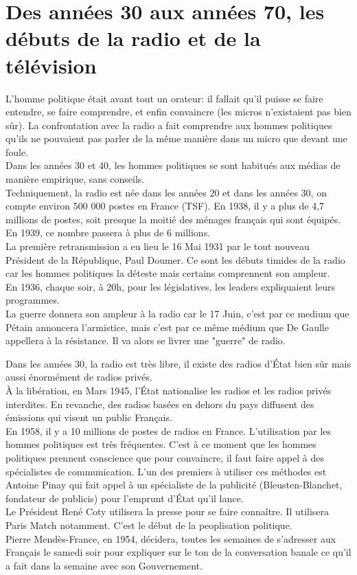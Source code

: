 \documentclass[12pt, a4paper, openany]{book}
\begin{document}
\section{Des années 30 aux années 70, les débuts de la radio et de la télévision}

L'homme politique était avant tout un orateur: il fallait qu'il puisse se faire entendre, se faire comprendre, et enfin convaincre (les micros n'existaient pas bien sûr). La confrontation avec la radio a fait comprendre aux hommes politiques qu'ils ne pouvaient pas parler de la même manière dans un micro que devant une foule. \\
Dans les années 30 et 40, les hommes politiques se sont habitués aux médias de manière empirique, sans conseils. \\
Techniquement, la radio est née dans les années 20 et dans les années 30, on compte environ 500 000 postes en France (TSF). En 1938, il y a plus de 4,7 millions de postes, soit presque la moitié des ménages français qui sont équipés. En 1939, ce nombre passera à plus de 6 millions. \\
La première retransmission a eu lieu le 16 Mai 1931 par le tout nouveau Président de la République, Paul Doumer. Ce sont les débuts timides de la radio car les hommes politiques la déteste mais certains comprennent son ampleur. \\
En 1936, chaque soir, à 20h, pour les législatives, les leaders expliquaient leurs programmes. \\
La guerre donnera son ampleur à la radio car le 17 Juin, c'est par ce medium que Pétain annoncera l'armistice, mais c'est par ce même médium que De Gaulle appellera à la résistance. Il va alors se livrer une "guerre" de radio.


Dans les années 30, la radio est très libre, il existe des radios d'État bien sûr mais aussi énormément de radios privés. \\
À la libération, en Mars 1945, l'État nationalise les radios et les radios privés interdites. En revanche, des radios basées en dehors du pays diffusent des émissions qui visent un public Français. \\
En 1958, il y a 10 millions de postes de radios en France. L'utilisation par les hommes politiques est très fréquentes. C'est à ce moment que les hommes politiques prennent conscience que pour convaincre, il faut faire appel à des spécialistes de communication. L'un des premiers à utiliser ces méthodes est Antoine Pinay qui fait appel à un spécialiste de la publicité (Bleusten-Blanchet, fondateur de publicis) pour l'emprunt d'État qu'il lance. \\
Le Président René Coty utilisera la presse pour se faire connaître. Il utilisera Paris Match notamment. C'est le début de la peoplisation politique. \\
Pierre Mendès-France, en 1954, décidera, toutes les semaines de s'adresser aux Français le samedi soir pour expliquer sur le ton de la conversation banale ce qu'il a fait dans la semaine avec son Gouvernement.
\end{document}
